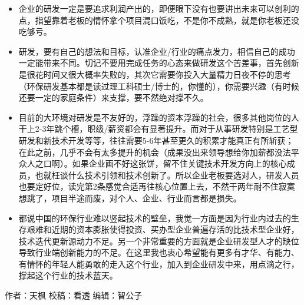 \documentclass[]{book}
\begin{document}
\begin{itemize}
\item
  企业的研发一定是要追求利润产出的，即便眼下没有也要讲出未来可以创利的点，指望靠着老板的情怀拿个项目混口饭吃，不是你不成熟，就是你老板还没吃够亏。
\item
  研发，要有自己的想法和目标，认准企业/行业的痛点发力，相信自己的成功一定能带来不同。切记不要用完成任务的心态来做研发这个苦差事，首先创新是很花时间又很大概率失败的，其次它需要你投入大量精力日夜不停的思考（环保研发基本都是读过理工科硕士/博士的，你懂的），你需要兴趣（有时候还要一定的家庭条件）来支撑，要不然绝对撑不久。
\item
  目前的大环境对研发是不友好的，浮躁的资本浮躁的社会，很多其他岗位的人干上2-3年跳个槽，职级/薪资都会有显著提升。而对于从事研发特别是工艺型研发和新技术开发等等，往往需要5-6年甚至更久的积累才能真正有所斩获；在此之前，几乎不会有太多提升的机会（成果没出来领导想给你加薪都没法平众人之口啊）。如果企业画不好这张饼，留不住关键技术开发方向上的核心成员，也就枉谈什么技术引领和技术创新了。所以企业老板要选对人，研发人员也要定好位，读完第2条感觉合适再往核心位置上去，不然干两年耐不住寂寞想跳了，项目半途而废，对个人、企业、行业而言都是损失。
\item
  都说中国的环保行业难以竖起技术的壁垒，我觉一方面是因为行业内过去的生存艰难和近期的资本膨胀使得投资、买办型企业普遍存活的比技术型企业好，技术迭代更新源动力不足。另一个非常重要的方面就是企业研发型人才的缺位导致行业端创新能力的不足。在这里我也衷心希望能有更多有才华、有能力、有情怀的年轻人能勇敢的走入这个行业，加入到企业研发中来，用点滴之行，撑起这个行业的技术蓝天。
\end{itemize}

作者：天枫 校稿：看透 编辑：智公子


\end{document}
